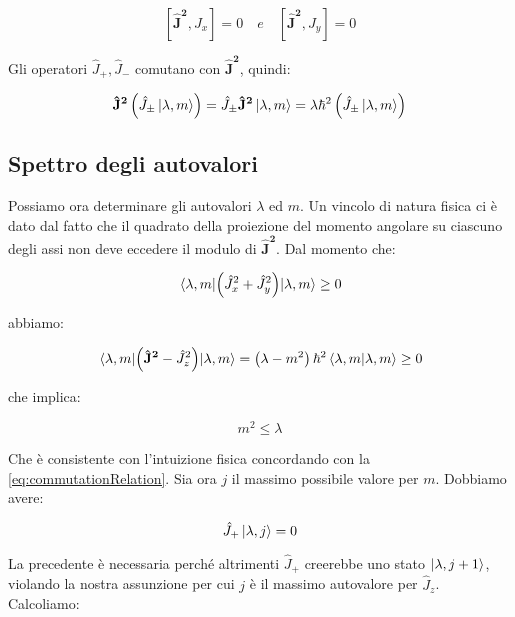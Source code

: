 	\begin{equation}
		\left [ \mathbf{\hat{J}^2}, J_x \right ] = 0 \quad e \quad \left [ \mathbf{\hat{J}^2}, J_y \right ] = 0
	\end{equation}

Gli operatori $\hat{J}_+, \hat{J}_-$ comutano con $\mathbf{\hat{J}^2}$, quindi:

	\begin{equation}
		\mathbf{\hat{J}^2} \left ( \hat{J}_\pm \ket{\lambda, m} \right ) = \hat{J}_\pm \mathbf{\hat{J}^2} \ket{\lambda, m} = \lambda \hbar^2 \left (
			\hat{J}_\pm \ket{\lambda, m} \right )
	\end{equation}

\subsection{Spettro degli autovalori}
Possiamo ora determinare gli autovalori $\lambda$ ed $m$. Un vincolo di natura fisica ci \`e dato dal fatto che il quadrato della proiezione del momento angolare su ciascuno degli assi non deve eccedere il modulo di $\mathbf{\hat{J}^2}$. Dal momento che:

	\begin{equation}
		\mel{\lambda, m}{\left ( \hat{J}^2_x + \hat{J}^2_y \right )}{\lambda, m} \ge 0
	\end{equation}

abbiamo:

	\begin{equation}
		\mel{\lambda, m}{\left ( \mathbf{\hat{J}^2} - \hat{J}^2_z \right )}{\lambda, m} = \left ( \lambda - m^2 \right ) \hbar^2 \braket{\lambda, m}{\lambda, m} \ge 0
	\end{equation}

che implica:

	\begin{equation}
		m^2 \le \lambda
	\end{equation}

Che \`e consistente con l'intuizione fisica concordando con la \eqref{eq:commutationRelation}. Sia ora $j$ il massimo possibile valore per $m$. Dobbiamo avere:

	\begin{equation}
		\hat{J}_+ \ket{\lambda, j} = 0
	\end{equation}

La precedente \`e necessaria perch\'e altrimenti $\hat{J}_+$ creerebbe uno stato $\ket{\lambda, j+1}$, violando la nostra assunzione per cui $j$ \`e il massimo autovalore per $\hat{J}_z$. Calcoliamo:

